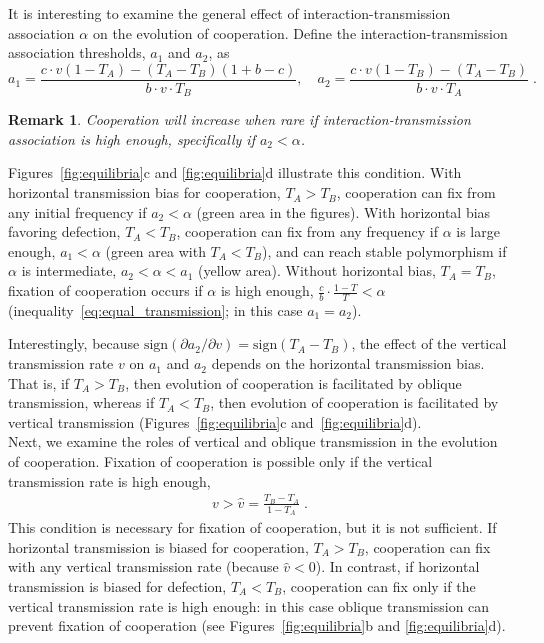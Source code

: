 \documentclass[12pt]{extarticle}
\newtheorem{remark}{Remark}
\begin{document}
It is interesting to examine the general effect of interaction-transmission association $\alpha$ on the evolution of cooperation.
Define the interaction-transmission association thresholds, $a_1$ and $a_2$, as 
\begin{equation} \label{eq:boundries_assortative_meeting_general_case}
  a_1 = \frac{c\cdot v(1-T_A) -(T_A-T_B)(1+b-c)}{b\cdot v \cdot T_B}, \quad
  a_2 = \frac{c\cdot v(1-T_B)-(T_A-T_B)}{b\cdot v\cdot T_A} \;.
\end{equation}

\begin{remark}%
\label{remark:intermediate_association_res3}
Cooperation will increase when rare if interaction-transmission association is high enough, specifically if $a_2 < \alpha$.
\end{remark}
Figures~\ref{fig:equilibria}c and \ref{fig:equilibria}d illustrate this condition.
With horizontal transmission bias for cooperation, $T_A>T_B$, cooperation can fix from any initial frequency if $a_2<\alpha$ (green area in the figures). 
With horizontal bias favoring defection, $T_A<T_B$, cooperation can fix from any frequency if $\alpha$ is large enough, $a_1<\alpha$ (green area with $T_A<T_B$), and can reach stable polymorphism if $\alpha$ is intermediate, $a_2<\alpha<a_1$ (yellow area).
Without horizontal bias, $T_A=T_B$, fixation of cooperation occurs if $\alpha$ is high enough, $\frac{c}{b} \cdot \frac{1-T}{T} < \alpha$ (inequality~\ref{eq:equal_transmission}; in this case $a_1=a_2$).

Interestingly, because $\text{sign} (\partial a_2 / \partial v) = \text{sign} (T_A-T_B)$, the effect of the vertical transmission rate $v$ on $a_1$ and $a_2$ depends on the horizontal transmission bias. 
That is, if $T_A>T_B$, then evolution of cooperation is facilitated by oblique transmission, whereas if $T_A<T_B$, then evolution of cooperation is facilitated by vertical transmission (Figures~\ref{fig:equilibria}c and~\ref{fig:equilibria}d).
\\

Next, we examine the roles of vertical and oblique transmission in the evolution of cooperation.
Fixation of cooperation is possible only if the vertical transmission rate is high enough,
  \begin{equation} \label{eq:fixation_of_cooperation_vertical_transmission_condition}
    \begin{aligned}
      v>\hat{v} = \frac{T_B - T_A}{1-T_A} \;.
    \end{aligned}
    \end{equation} 
This condition is necessary for fixation of cooperation, but it is not sufficient.
If horizontal transmission is biased for cooperation, $T_A>T_B$, cooperation can fix with any vertical transmission rate (because $\hat{v}<0$).
In contrast, if horizontal transmission is biased for defection, $T_A<T_B$,  cooperation can fix only if the vertical transmission rate is high enough: in this case oblique transmission can prevent fixation of cooperation (see Figures~\ref{fig:equilibria}b and \ref{fig:equilibria}d).
\end{document}
